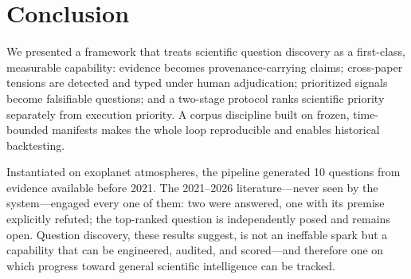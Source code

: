 \section{Conclusion}
\label{sec:conclusion}

We presented a framework that treats scientific question discovery as a
first-class, measurable capability: evidence becomes provenance-carrying
claims; cross-paper tensions are detected and typed under human
adjudication; prioritized signals become falsifiable questions; and a
two-stage protocol ranks scientific priority separately from execution
priority. A corpus discipline built on frozen, time-bounded manifests
makes the whole loop reproducible and enables historical backtesting.

Instantiated on exoplanet atmospheres, the pipeline generated 10
questions from evidence available before 2021. The 2021--2026
literature---never seen by the system---engaged every one of them:
two were answered, one with its premise explicitly refuted; the
top-ranked question is independently posed and remains open. Question
discovery, these results suggest, is not an ineffable spark but a
capability that can be engineered, audited, and scored---and therefore
one on which progress toward general scientific intelligence can be
tracked.
